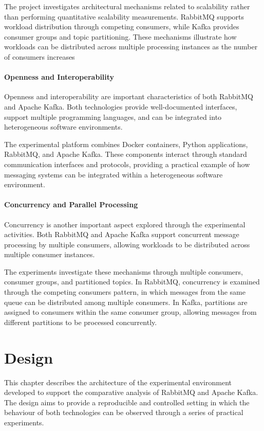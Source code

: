 \documentclass{scrartcl}
\begin{document}
The project investigates architectural mechanisms related to scalability rather than performing quantitative scalability measurements. RabbitMQ supports workload distribution through competing consumers, while Kafka provides consumer groups and topic partitioning. These mechanisms illustrate how workloads can be distributed across multiple processing instances as the number of consumers increases

\paragraph{Openness and Interoperability}

Openness and interoperability are important characteristics of both RabbitMQ and Apache
Kafka. Both technologies provide well-documented interfaces, support multiple programming
languages, and can be integrated into heterogeneous software environments.

The experimental platform combines Docker containers, Python applications, RabbitMQ,
and Apache Kafka. These components interact through standard communication interfaces
and protocols, providing a practical example of how messaging systems can be integrated
within a heterogeneous software environment.

\paragraph{Concurrency and Parallel Processing}

Concurrency is another important aspect explored through the experimental activities. Both RabbitMQ and Apache Kafka support concurrent message processing by multiple consumers, allowing workloads to be distributed across multiple consumer instances.

The experiments investigate these mechanisms through multiple consumers, consumer groups, and partitioned topics. In RabbitMQ, concurrency is examined through the competing consumers pattern, in which messages from the same queue can be distributed among multiple consumers. In Kafka, partitions are assigned to consumers within the same consumer group, allowing messages from different partitions to be processed concurrently.


\section{Design}\label{design}

This chapter describes the architecture of the experimental environment developed to support the comparative analysis of RabbitMQ and Apache Kafka. The design aims to provide a reproducible and controlled setting in which the behaviour of both technologies can be observed through a series of practical experiments.
\end{document}
